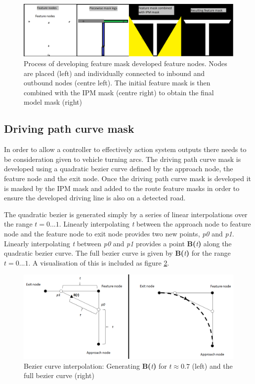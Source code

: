 \documentclass[]{aiaa-tc}%
\begin{document}
\begin{figure}
	\centering
	\includegraphics[width=1\textwidth]{FeatureMatching/featureMaskDevelopment.png}
	\caption{Process of developing feature mask developed feature nodes. Nodes are placed (left) and individually connected to inbound and outbound nodes (centre left). The initial feature mask is then combined with the IPM mask (centre right) to obtain the final model mask (right)}
	\label{f:featureMaskDevelopment}
\end{figure}


\subsection{Driving path curve mask} \label{s:drivingPathMatching}

In order to allow a controller to effectively action system outputs there needs to be consideration given to vehicle turning arcs. The driving path curve mask is developed using a quadratic bezier curve defined by the approach node, the feature node and the exit node. Once the driving path curve mask is developed it is masked by the IPM mask and added to the route feature masks in order to ensure the developed driving line is also on a detected road. 

The quadratic bezier is generated simply by a series of linear interpolations over the range $t=0...1$. Linearly interpolating \textit{t} between the approach node to feature node and the feature node to exit node provides two new points, \textit{p0} and \textit{p1}. Linearly interpolating \textit{t} between \textit{p0} and \textit{p1} provides a point \textbf{B(}\textit{t}\textbf{)} along the quadratic bezier curve. The full bezier curve is given by \textbf{B(}\textit{t}\textbf{)} for the range $t=0...1$. A visualisation of this is included as figure \ref{f:quadraticBezier}.

\begin{figure}
	\centering
	\includegraphics[width=1\textwidth]{bezier/quadraticBezier.png}
	\caption{Bezier curve interpolation: Generating \textbf{B(}\textit{t}\textbf{)} for $t\approx0.7$ (left) and the full bezier curve (right)}
	\label{f:quadraticBezier}
\end{figure}
\end{document}
